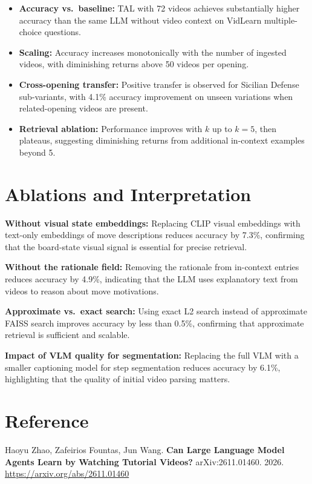 \documentclass[10pt,twocolumn]{article}
\begin{document}
\begin{itemize}[itemsep=2pt,parsep=0pt]
  \item \textbf{Accuracy vs.\ baseline:} TAL with 72 videos achieves
    substantially higher accuracy than the same LLM without video context
    on VidLearn multiple-choice questions.
  \item \textbf{Scaling:} Accuracy increases monotonically with the
    number of ingested videos, with diminishing returns above 50 videos
    per opening.
  \item \textbf{Cross-opening transfer:} Positive transfer is observed
    for Sicilian Defense sub-variants, with 4.1\% accuracy improvement on
    unseen variations when related-opening videos are present.
  \item \textbf{Retrieval ablation:} Performance improves with $k$ up to
    $k = 5$, then plateaus, suggesting diminishing returns from additional
    in-context examples beyond 5.
\end{itemize}

\section{Ablations and Interpretation}

\textbf{Without visual state embeddings:} Replacing CLIP visual embeddings
with text-only embeddings of move descriptions reduces accuracy by 7.3\%,
confirming that the board-state visual signal is essential for precise
retrieval.

\textbf{Without the rationale field:} Removing the rationale from
in-context entries reduces accuracy by 4.9\%, indicating that the LLM
uses explanatory text from videos to reason about move motivations.

\textbf{Approximate vs.\ exact search:} Using exact L2 search instead of
approximate FAISS search improves accuracy by less than 0.5\%, confirming
that approximate retrieval is sufficient and scalable.

\textbf{Impact of VLM quality for segmentation:} Replacing the full VLM
with a smaller captioning model for step segmentation reduces accuracy by
6.1\%, highlighting that the quality of initial video parsing matters.

\section*{Reference}

Haoyu Zhao, Zafeirios Fountas, Jun Wang.
\textbf{Can Large Language Model Agents Learn by Watching Tutorial
Videos?}
arXiv:2611.01460. 2026.
\url{https://arxiv.org/abs/2611.01460}
\end{document}
